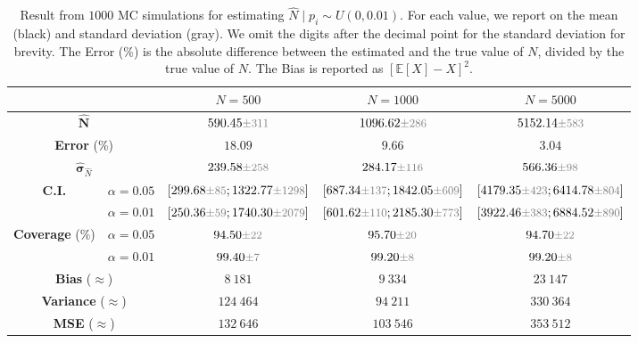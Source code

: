 \begin{table}[t]
    \centering 
    \caption*{$p_i \sim U(0, 0.01)$}
    \begin{tabular}{c c|c c c}
        \toprule
        & & \multicolumn{1}{|c|}{${N}=500$} & \multicolumn{1}{c|}{${N}=1000$} & \multicolumn{1}{c}{${N}=5000$} \\
        \midrule
        \multicolumn{2}{c|}{${\hat{\mathbf{N}}}$} & $590.45 \variance{311}$ & $1096.62 \variance{286}$ & $5152.14 \variance{583}$  \\
        \multicolumn{2}{c|}{\textbf{Error} (\%)} & $18.09$ & $9.66$ & $3.04$ \\
        \multicolumn{2}{c|}{${\hat{\mathbf{\sigma}}}_{\hat{N}}$} & $239.58 \variance{258}$ & $284.17 \variance{116}$ & $566.36 \variance{98}$\\
        \multirow{2}{*}{\textbf{C.I.}} & $\alpha = 0.05$ & $[299.68 \variance{85}; 1322.77 \variance{1298}]$ & $[687.34 \variance{137}; 1842.05 \variance{609}]$ & $[4179.35 \variance{423}; 6414.78 \variance{804}]$
        \\
        & $\alpha = 0.01$ & $[250.36 \variance{59}; 1740.30 \variance{2079}]$ & $[601.62 \variance{110}; 2185.30 \variance{773}]$ & $[3922.46 \variance{383}; 6884.52 \variance{890}]$ \\
        \midrule
        \multirow{2}{*}{\textbf{Coverage} (\%)} & $\alpha = 0.05$ & $94.50 \variance{22}$ & $95.70 \variance{20}$ & $94.70 \variance{22}$ \\
        & $\alpha = 0.01$ & $99.40 \variance{7}$ & $99.20 \variance{8}$ & $99.20 \variance{8}$ \\
        \multicolumn{2}{c|}{\textbf{Bias} ($\approx$)} & $8\ 181$ & $9\ 334$ & $23\ 147$ \\
        \multicolumn{2}{c|}{\textbf{Variance} ($\approx$)} & $124\ 464$ & $94\ 211$ & $330\ 364$ \\
        \multicolumn{2}{c|}{\textbf{MSE} ($\approx$)} & $132\ 646$ & $103\ 546$ & $353\ 512$ \\
        \bottomrule
    \end{tabular}
    \caption{Result from $1000$ MC simulations for estimating $\hat{N} \mid p_i \sim U(0, 0.01)$. For each value, we report on the mean (black) and standard deviation (gray). We omit the digits after the decimal point for the standard deviation for brevity.
    The Error (\%) is the absolute difference between the estimated and the true value of $N$, divided by the true value of $N$. The Bias is reported as ${\left[ \mathbb{E}[X] - X \right]}^2$.}
    \label{tab:problem_2_results_uniform_0_01}
\end{table}

